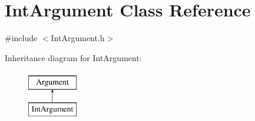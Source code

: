 \hypertarget{classIntArgument}{\section{Int\-Argument Class Reference}
\label{classIntArgument}
}


{\ttfamily \#include $<$Int\-Argument.\-h$>$}

Inheritance diagram for Int\-Argument\-:\begin{figure}[H]
\begin{center}
\leavevmode
\includegraphics[height=2.000000cm]{classIntArgument}
\end{center}
\end{figure}
